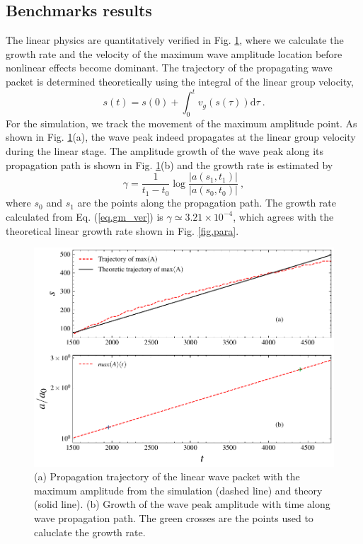 \documentclass[times,12pt,3p,longtitle]{elsarticle}
\begin{document}
\subsection{Benchmarks results}
The linear physics are quantitatively verified in Fig. \ref{fig.linear}, where we calculate the growth rate and the velocity of the maximum wave amplitude location before nonlinear effects become dominant.
  The trajectory of the propagating wave packet is determined theoretically using the integral of the linear group velocity,
\begin{equation}
    s(t) = s(0) + \int_0^{t} v_g(s(\tau)) \mathrm{d} \tau~.
\end{equation}
For the simulation,
 we track the movement of the maximum amplitude point. 
 As shown in Fig. \ref{fig.linear}(a), 
 the wave peak indeed propagates at the linear group velocity during the linear stage.
 The 
 amplitude growth of the wave peak along its propagation path
is shown in Fig. \ref{fig.linear}(b)
and 
 the growth rate is estimated by \cite{nogi2022}
\begin{equation}\label{eq.gm_ver}
        \gamma = \frac{1}{t_1-t_0}\log\frac{|a(s_1,t_1)|}{|a(s_0,t_0)|}~,
\end{equation}
where $s_0$ and $s_1$ are the points along the propagation path.
The  growth rate calculated from Eq. (\ref{eq.gm_ver}) is $\gamma \simeq 3.21\times10^{-4}$, which agrees with the theoretical linear growth rate shown in Fig. \ref{fig.para}.
\begin{figure}[htbp]
    \centering
    \includegraphics[scale=0.5]{fig_linear.pdf}
    \caption{ (a) Propagation trajectory of the linear wave packet with the maximum amplitude from the simulation (dashed line) and theory (solid line).  (b)  Growth of the wave peak amplitude with time along wave propagation path. The green crosses are the points used to caluclate the growth rate.}
    \label{fig.linear}
\end{figure}
\end{document}
